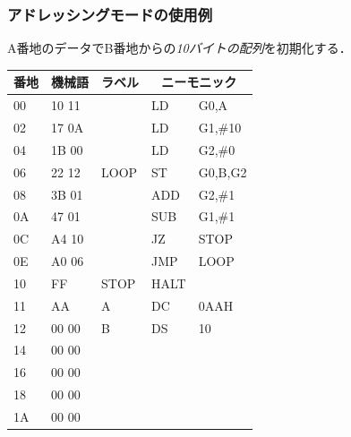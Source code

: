 \documentclass{beamer}                 %
\begin{document}
\begin{frame}
  \frametitle{アドレッシングモードの使用例}
  A番地のデータでB番地からの\emph{10バイトの配列}を初期化する．
  \vfill
  \begin{minipage}{0.58\columnwidth}
    {\small\ttfamily\begin{center}
      \begin{tabular}{|l|l|l|l l|} \hline
        番地 & 機械語 & ラベル & \multicolumn{2}{|c|}{ニーモニック} \\
        \hline
        00 & 10 11 &      & LD   & G0,A          \\
        02 & 17 0A &      & LD   & G1,\#10       \\
        04 & 1B 00 &      & LD   & G2,\#0        \\
        06 & 22 12 & LOOP & ST   & G0,B,G2       \\
        08 & 3B 01 &      & ADD  & G2,\#1        \\
        0A & 47 01 &      & SUB  & G1,\#1        \\
        0C & A4 10 &      & JZ   & STOP          \\
        0E & A0 06 &      & JMP  & LOOP          \\
        10 & FF    & STOP & HALT &               \\
        11 & AA    & A    & DC   & 0AAH          \\
        12 & 00 00 & B    & DS   & 10            \\
        14 & 00 00 &      &      &               \\
        16 & 00 00 &      &      &               \\
        18 & 00 00 &      &      &               \\
        1A & 00 00 &      &      &               \\
        \hline
      \end{tabular}
    \end{center}}
  \end{minipage}
  \begin{minipage}{0.38\columnwidth}

\end{minipage}
\end{frame}
\end{document}
